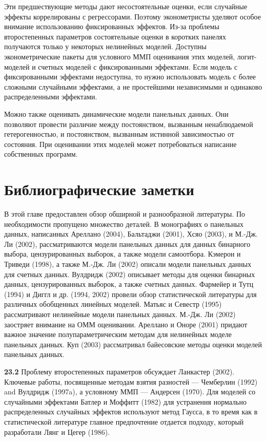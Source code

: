 Эти предшествующие методы дают несостоятельные оценки, если случайные эффекты коррелированы с регрессорами. Поэтому эконометристы уделяют особое внимание использованию фиксированных эффектов. Из-за проблемы второстепенных параметров состоятельные оценки в коротких панелях получаются только у некоторых нелинейных моделей. Доступны эконометрические пакеты для условного ММП оценивания этих моделей, логит-моделей и счетных моделей с фиксированными эффектами. Если модель с фиксированными эффектами недоступна, то нужно использовать модель с более сложными случайными эффектами, а не простейшими независимыми и одинаково распределенными эффектами.

Можно также оценивать динамические модели панельных данных. Они позволяют провести различие между постоянством, вызванным ненаблюдаемой гетерогенностью, и постоянством, вызванным истинной зависимостью от состояния. При оценивании этих моделей может потребоваться написание собственных программ.


\section{Библиографические заметки}

В этой главе предоставлен обзор обширной и разнообразной литературы. По необходимости пропущено множество деталей. В монографиях о панельных данных, написанных Ареллано (2004), Бальтаджи (2001), Хсяо (2003), и М.-Дж. Ли (2002), рассматриваются модели панельных данных для данных бинарного выбора, цензурированных выборок, а также модели самоотбора. Кэмерон и Триведи (1998), а также М.-Дж. Ли (2002) описали модели панельных данных для счетных данных. Вулдридж (2002) описывает методы для оценки бинарных данных, цензурированных выборок, а также счетных данных. Фармейер и Тутц (1994) и Диггл и др. (1994, 2002) провели обзор статистической литературы для различных обобщенных линейных моделей. Матьяс и Севестр (1995) рассматривают нелинейные модели панельных данных. М.-Дж. Ли (2002) заостряет внимание на ОММ оценивании. Ареллано и Оноре (2001) придают важное значение полупараметрическим методам для нелинейных моделе панельных данных. Куп (2003) рассматривал байесовские методы оценки моделей панельных данных.

\textbf{23.2} Проблему второстепенных параметров обсуждает Ланкастер (2002). Ключевые работы, посвященные методам взятия разностей ---  Чемберлин (1992) and Вулдридж (1997a), а условному ММП --- Андерсен (1970). Для моделей со случайными эффектами Батлер и Моффитт (1982) для устранения нормально распределенных случайных эффектов используют метод Гаусса, в то время как в статистической литературе главное предпочтение отдается подходу, который разработали Лянг и Цегер (1986).


